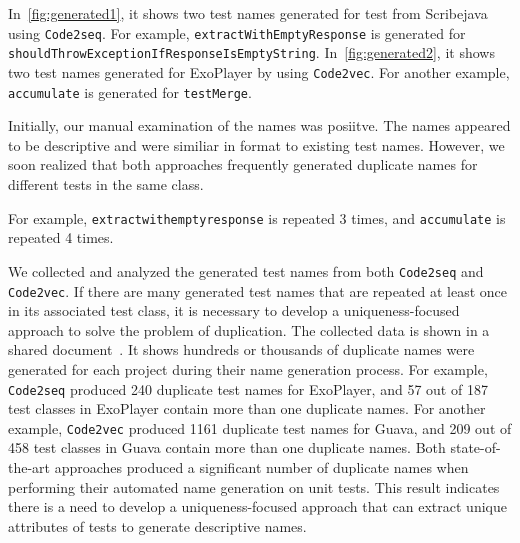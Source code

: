 \begin{appendices}
In~\cref{fig:generated1}, it shows two test names generated for test from Scribejava using \texttt{Code2seq}.
%
For example, \texttt{extract\-With\-Empty\-Response} is generated for \texttt{should\-Throw\-Exception\-If\-Response\-Is\-Empty\-String}.
%
In~\cref{fig:generated2}, it shows two test names generated for ExoPlayer by using \texttt{Code2vec}.
%
For another example, \texttt{accumulate} is generated for \texttt{test\-Merge}.


Initially, our manual examination of the names was posiitve.
%
The names appeared to be descriptive and were similiar in format to existing test names.
%
However, we soon realized that both approaches frequently generated duplicate names for different tests in the same class.



For example, \texttt{extract\-with\-empty\-response} is repeated \num{3} times, and \texttt{accumulate} is repeated \num{4} times.





We collected and analyzed the generated test names from both \texttt{Code2seq} and \texttt{Code2vec}.
%
If there are many generated test names that are repeated at least once in its associated test class, it is necessary to develop a uniqueness-focused approach to solve the problem of duplication.
%
The collected data is shown in a shared document~\cite{CodeResult}.
%
It shows hundreds or thousands of duplicate names were generated for each project during their name generation process. 
%
For example, \texttt{Code2seq} produced \num{240} duplicate test names for ExoPlayer, and \num{57} out of \num{187} test classes in ExoPlayer contain more than one duplicate names.
%
For another example, \texttt{Code2vec} produced \num{1161} duplicate test names for Guava, and \num{209} out of \num{458} test classes in Guava contain more than one duplicate names.
%
Both state-of-the-art approaches produced a significant number of duplicate names when performing their automated name generation on unit tests.
%
This result indicates there is a need to develop a uniqueness-focused approach that can extract unique attributes of tests to generate descriptive names.


\end{appendices}